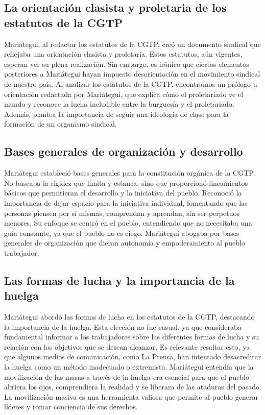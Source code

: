 \documentclass[
  a4paper,
]{article}
\begin{document}
\hypertarget{la-orientaciuxf3n-clasista-y-proletaria-de-los-estatutos-de-la-cgtp}{%
\subsection{La orientación clasista y proletaria de los estatutos de la
CGTP}\label{la-orientaciuxf3n-clasista-y-proletaria-de-los-estatutos-de-la-cgtp}}

Mariátegui, al redactar los estatutos de la CGTP, creó un documento
sindical que reflejaba una orientación clasista y proletaria. Estos
estatutos, aún vigentes, esperan ver su plena realización. Sin embargo,
es irónico que ciertos elementos posteriores a Mariátegui hayan impuesto
desorientación en el movimiento sindical de nuestro país. Al analizar
los estatutos de la CGTP, encontramos un prólogo u orientación redactada
por Mariátegui, que explica cómo el proletariado ve el mundo y reconoce
la lucha ineludible entre la burguesía y el proletariado. Además,
plantea la importancia de seguir una ideología de clase para la
formación de un organismo sindical.

\hypertarget{bases-generales-de-organizaciuxf3n-y-desarrollo}{%
\subsection{Bases generales de organización y
desarrollo}\label{bases-generales-de-organizaciuxf3n-y-desarrollo}}

Mariátegui estableció bases generales para la constitución orgánica de
la CGTP. No buscaba la rigidez que limita y estanca, sino que
proporcionó lineamientos básicos que permitieran el desarrollo y la
iniciativa del pueblo. Reconoció la importancia de dejar espacio para la
iniciativa individual, fomentando que las personas piensen por sí
mismas, comprendan y aprendan, sin ser perpetuos menores. Su enfoque se
centró en el pueblo, entendiendo que no necesitaba una guía constante,
ya que el pueblo no es ciego. Mariátegui abogaba por bases generales de
organización que dieran autonomía y empoderamiento al pueblo trabajador.

\hypertarget{las-formas-de-lucha-y-la-importancia-de-la-huelga}{%
\subsection{Las formas de lucha y la importancia de la
huelga}\label{las-formas-de-lucha-y-la-importancia-de-la-huelga}}

Mariátegui abordó las formas de lucha en los estatutos de la CGTP,
destacando la importancia de la huelga. Esta elección no fue casual, ya
que consideraba fundamental informar a los trabajadores sobre las
diferentes formas de lucha y su relación con los objetivos que se desean
alcanzar. Es relevante resaltar esto, ya que algunos medios de
comunicación, como La Prensa, han intentado desacreditar la huelga como
un método inadecuado o extremista. Mariátegui entendía que la
movilización de las masas a través de la huelga era esencial para que el
pueblo abriera los ojos, comprendiera la realidad y se liberara de las
ataduras del pasado. La movilización masiva es una herramienta valiosa
que permite al pueblo generar líderes y tomar conciencia de sus
derechos.
\end{document}
